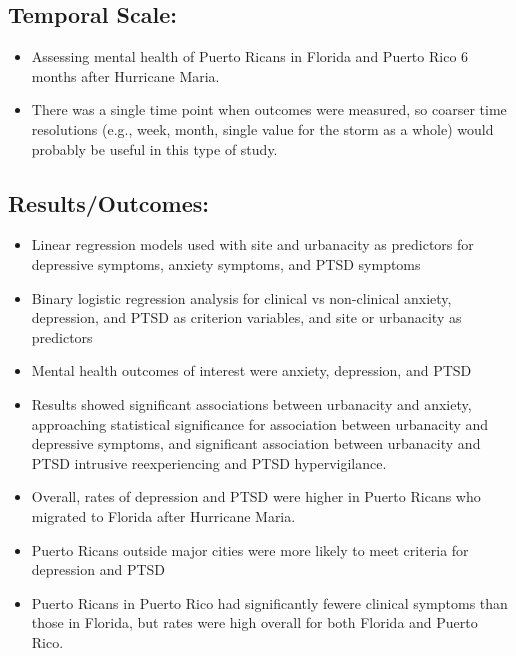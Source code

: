 \documentclass[
]{article}
\providecommand{\tightlist}{%
  \setlength{\itemsep}{0pt}\setlength{\parskip}{0pt}}
\begin{document}
\hypertarget{temporal-scale-5}{%
\subsection{Temporal Scale:}\label{temporal-scale-5}}

\begin{itemize}
\tightlist
\item
  Assessing mental health of Puerto Ricans in Florida and Puerto Rico 6
  months after Hurricane Maria.
\item
  There was a single time point when outcomes were measured, so coarser
  time resolutions (e.g., week, month, single value for the storm as a
  whole) would probably be useful in this type of study.
\end{itemize}

\hypertarget{resultsoutcomes-4}{%
\subsection{Results/Outcomes:}\label{resultsoutcomes-4}}

\begin{itemize}
\tightlist
\item
  Linear regression models used with site and urbanacity as predictors
  for depressive symptoms, anxiety symptoms, and PTSD symptoms
\item
  Binary logistic regression analysis for clinical vs non-clinical
  anxiety, depression, and PTSD as criterion variables, and site or
  urbanacity as predictors
\item
  Mental health outcomes of interest were anxiety, depression, and PTSD
\item
  Results showed significant associations between urbanacity and
  anxiety, approaching statistical significance for association between
  urbanacity and depressive symptoms, and significant association
  between urbanacity and PTSD intrusive reexperiencing and PTSD
  hypervigilance.
\item
  Overall, rates of depression and PTSD were higher in Puerto Ricans who
  migrated to Florida after Hurricane Maria.
\item
  Puerto Ricans outside major cities were more likely to meet criteria
  for depression and PTSD
\item
  Puerto Ricans in Puerto Rico had significantly fewere clinical
  symptoms than those in Florida, but rates were high overall for both
  Florida and Puerto Rico.
\end{itemize}
\end{document}
